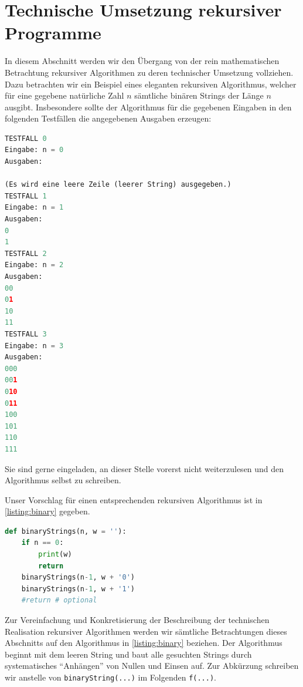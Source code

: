 \section{Technische Umsetzung rekursiver Programme}\label{technisch}
In diesem Abschnitt werden wir den Übergang von der rein mathematischen Betrachtung rekursiver Algorithmen zu deren technischer Umsetzung vollziehen. Dazu betrachten wir ein Beispiel eines eleganten rekursiven Algorithmus, welcher für eine gegebene natürliche Zahl $n$ sämtliche binären Strings der Länge $n$ ausgibt. Insbesondere sollte der Algorithmus für die gegebenen Eingaben in den folgenden Testfällen die angegebenen Ausgaben erzeugen:
\begin{lstlisting}[language=Python,caption=binäre Strings rekursiv ausgeben,numbers=none]
TESTFALL 0
Eingabe: n = 0
Ausgaben:

(Es wird eine leere Zeile (leerer String) ausgegeben.)
TESTFALL 1
Eingabe: n = 1
Ausgaben:
0
1
TESTFALL 2
Eingabe: n = 2
Ausgaben:
00
01
10
11
TESTFALL 3
Eingabe: n = 3
Ausgaben:
000
001
010
011
100
101
110
111
\end{lstlisting}
Sie sind gerne eingeladen, an dieser Stelle vorerst nicht weiterzulesen und den Algorithmus selbst zu schreiben.

Unser Vorschlag für einen entsprechenden rekursiven Algorithmus ist in \cref{listing:binary} gegeben.
\begin{lstlisting}[language=Python,caption=binaryStrings,label=listing:binary]
def binaryStrings(n, w = ''):
    if n == 0:
        print(w)
        return
    binaryStrings(n-1, w + '0')
    binaryStrings(n-1, w + '1')
    #return # optional
\end{lstlisting}
Zur Vereinfachung und Konkretisierung der Beschreibung der technischen Realisation rekursiver Algorithmen werden wir sämtliche Betrachtungen dieses Abschnitts auf den Algorithmus in \cref{listing:binary} beziehen. Der Algorithmus beginnt mit dem leeren String und baut alle gesuchten Strings durch systematisches \enquote{Anhängen} von Nullen und Einsen auf. Zur Abkürzung schreiben wir anstelle von \verb|binaryString(...)| im Folgenden \verb|f(...)|.

